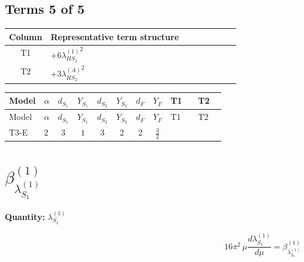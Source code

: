 \documentclass[8pt]{article}
\begin{document}
\begin{landscape}
\subsection*{Terms 5 of 5}
\begin{center}
\begin{tabular}{@{}c >{\raggedright\arraybackslash}p{0.82\linewidth}@{}}
\toprule
Column & Representative term structure \\
\midrule
T1 & \(\displaystyle +6 {\lambda_{HS_2}^{(1)}}^2\) \\
\midrule
T2 & \(\displaystyle +3 {\lambda_{HS_2}^{(A)}}^2\) \\
\midrule
\bottomrule
\end{tabular}
\end{center}
\smallskip
\tiny
\begin{longtable}{@{}llcccccc >{\raggedright\arraybackslash}p{0.21\linewidth} >{\raggedright\arraybackslash}p{0.21\linewidth}@{}}
\toprule
Model & $\alpha$ & $d_{S_1}$ & $Y_{S_1}$ & $d_{S_2}$ & $Y_{S_2}$ & $d_F$ & $Y_F$ & T1 & T2 \\
\midrule
\endfirsthead
\toprule
Model & $\alpha$ & $d_{S_1}$ & $Y_{S_1}$ & $d_{S_2}$ & $Y_{S_2}$ & $d_F$ & $Y_F$ & T1 & T2 \\
\midrule
\endhead
T3-E & $2$ & $3$ & $1$ & $3$ & $2$ & $2$ & $\frac{3}{2}$ & \scriptsize\adjustbox{max width=\linewidth}{$\begin{gathered} +6 {\lambda_{HS_2}^{(1)}}^2\end{gathered}$} & \scriptsize\adjustbox{max width=\linewidth}{$\begin{gathered} +3 {\lambda_{HS_2}^{(A)}}^2\end{gathered}$} \\
\midrule
\bottomrule
\end{longtable}
\clearpage
\section*{$\beta_{\lambda_{S_1}^{(1)}}^{(1)}$}
\noindent\textbf{Quantity: }$\lambda_{S_1}^{(1)}$\par\smallskip
\[16\pi^2\,\mu\frac{d \lambda_{S_1}^{(1)}}{d\mu}=\beta_{\lambda_{S_1}^{(1)}}^{(1)}\]

\end{landscape}
\end{document}
